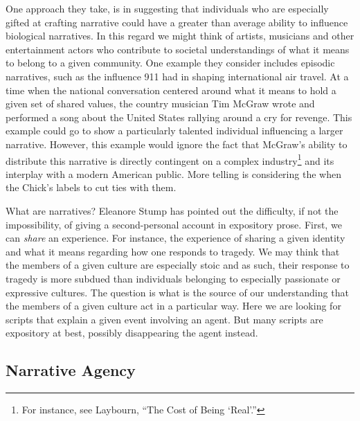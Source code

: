\documentclass[phdthesis,12pt,final,a4paper]{wuthesis}
\theoremstyle{definition}
\theoremstyle{definition}
\theoremstyle{definition}
\theoremstyle{definition}
\theoremstyle{remark}
\begin{document}
One approach they take, is in suggesting that individuals who are especially gifted at crafting narrative could have a greater than average ability to influence biological narratives. In this regard we might think of artists, musicians and other entertainment actors who contribute to societal understandings of what it means to belong to a given community. One example they consider includes episodic narratives, such as the influence 911 had in shaping international air travel. At a time when the national conversation centered around what it means to hold a given set of shared values, the country musician Tim McGraw wrote and performed a song about the United States rallying around a cry for revenge. This example could go to show a particularly talented individual influencing a larger narrative. However, this example would ignore the fact that McGraw's ability to distribute this narrative is directly contingent on a complex industry\footnote{For instance, see Laybourn, {``The Cost of Being {`Real'}.''}} and its interplay with a modern American public. More telling is considering the when the Chick's labels to cut ties with them.

What are narratives? Eleanore Stump has pointed out the difficulty, if not the impossibility, of giving a second-personal account in expository prose. First, we can \emph{share} an experience. For instance, the experience of sharing a given identity and what it means regarding how one responds to tragedy. We may think that the members of a given culture are especially stoic and as such, their response to tragedy is more subdued than individuals belonging to especially passionate or expressive cultures. The question is what is the source of our understanding that the members of a given culture act in a particular way. Here we are looking for scripts that explain a given event involving an agent. But many scripts are expository at best, possibly disappearing the agent instead.

\subsection*{Narrative Agency}\label{narrative-agency}
\end{document}
